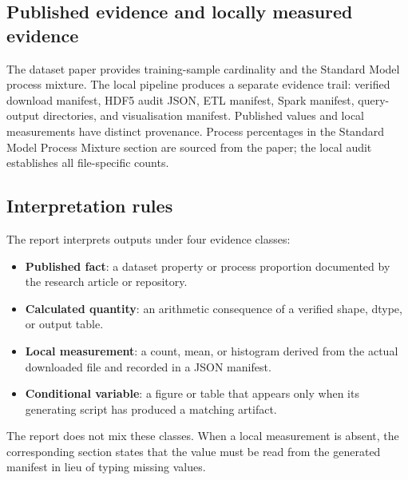 \documentclass[11pt,a4paper]{article}
\begin{document}
\subsection{Published evidence and locally measured evidence}

The dataset paper provides training-sample cardinality and the Standard Model process mixture. The local pipeline produces a separate evidence trail: verified download manifest, HDF5 audit JSON, ETL manifest, Spark manifest, query-output directories, and visualisation manifest. Published values and local measurements have distinct provenance. Process percentages in the Standard Model Process Mixture section are sourced from the paper; the local audit establishes all file-specific counts.


\subsection{Interpretation rules}

The report interprets outputs under four evidence classes:
\begin{itemize}
  \item \textbf{Published fact}: a dataset property or process proportion documented by the research article or repository.
  \item \textbf{Calculated quantity}: an arithmetic consequence of a verified shape, dtype, or output table.
  \item \textbf{Local measurement}: a count, mean, or histogram derived from the actual downloaded file and recorded in a JSON manifest.
  \item \textbf{Conditional variable}: a figure or table that appears only when its generating script has produced a matching artifact.
\end{itemize}
The report does not mix these classes. When a local measurement is absent, the corresponding section states that the value must be read from the generated manifest in lieu of typing missing values.
\end{document}
